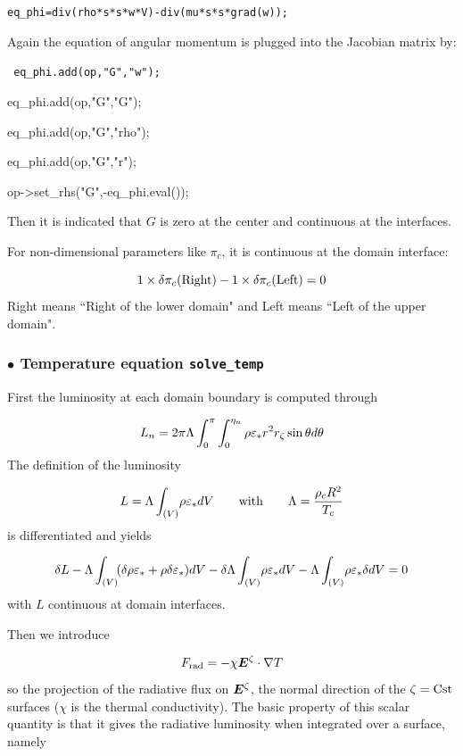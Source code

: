 \bigskip
\centerline{\tt  eq\_phi=div(rho*s*s*w*V)-div(mu*s*s*grad(w));}
\bigskip

Again the equation of angular momentum is plugged into the Jacobian
matrix by:

\bigskip
\begin{center}
{\tt
        eq\_phi.add(op,"G","w");  \par
        eq\_phi.add(op,"G","G");  \par
        eq\_phi.add(op,"G","rho");  \par
        eq\_phi.add(op,"G","r");  \par
        op->set\_rhs("G",-eq\_phi.eval());  \par
}
\end{center}
\bigskip
Then it is indicated that $G$ is zero at the center and continuous at
the interfaces.







For non-dimensional parameters like $\pi_c$, it is continuous at the domain
interface:

\[ 1\times\delta\pi_c({\rm Right}) -1\times\delta\pi_c({\rm Left}) = 0\]
Right means ``Right of the lower domain" and Left means ``Left of the upper
domain".

\subsubsection{$\bullet$ \bf Temperature equation {\tt solve\_temp}}

First the luminosity at each domain boundary is computed through

\[ L_n = 2\pi\Lambda\int_0^\pi\int_0^{\eta_n} \rho\varepsilon_* r^2r_\zeta\sin\theta
d\theta\]
The definition of the luminosity 

\[ L=\Lambda\int_{(V)}\! \rho\varepsilon_* dV {\qquad {\rm with}\qquad} \Lambda = \frac{\rho_cR^2}{T_c}\]
is differentiated and yields

\[ \delta L - \Lambda\int_{(V)}\! (\delta\rho\varepsilon_* +\rho\delta\varepsilon_*)dV -
\delta\Lambda\int_{(V)}\! \rho\varepsilon_* dV - \Lambda\int_{(V)}\! \rho\varepsilon_* \delta dV
= 0\]
with $L$ continuous at domain interfaces.

Then we introduce

\[ \frad = -\chi\vE^\zeta\cdot\na T\]
so the projection of the radiative flux on $\vE^\zeta$, the normal
direction of the $\zeta={\rm Cst}$ surfaces ($\chi$ is the thermal
conductivity). The basic property of this
scalar quantity is that it gives the radiative luminosity when
integrated over a surface, namely

